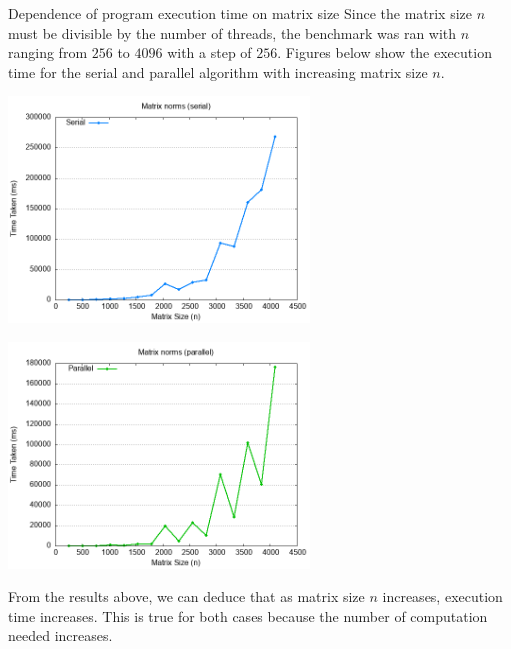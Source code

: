 \documentclass[12pt]{article}
\begin{document}
\begin{section}{Dependence of program execution time on matrix size}
 Since the matrix size $n$ must be divisible by the number of threads, the benchmark was ran with $n$ ranging from
 $256$ to $4096$ with a step of $256$. Figures below show the execution time for the serial and parallel algorithm with
 increasing matrix size $n$.

 \begin{center}
     \begin{minipage}{0.48\linewidth}
         \includegraphics*[width=8cm]{images/benchmark_serial.png}
     \end{minipage}
     \begin{minipage}{0.48\linewidth}
         \includegraphics*[width=8cm]{images/benchmark_parallel_openmp.png}
     \end{minipage}
 \end{center}

 From the results above, we can deduce that as matrix size $n$ increases, execution time increases. This is true for both cases because
 the number of computation needed increases.

\end{section}
\end{document}
